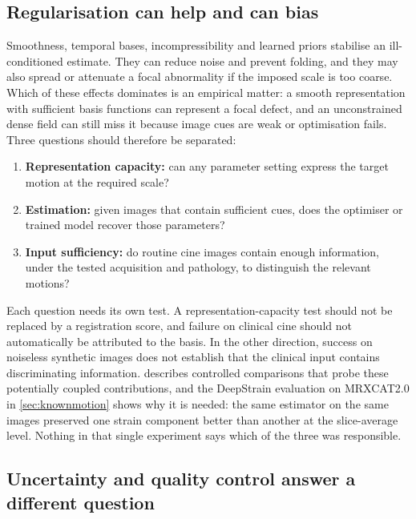 \subsection{Regularisation can help and can bias}\label{sec:threequestions}

Smoothness, temporal bases, incompressibility and learned priors stabilise an ill-conditioned estimate. They can reduce noise and prevent folding, and they may also spread or attenuate a focal abnormality if the imposed scale is too coarse. Which of these effects dominates is an empirical matter: a smooth representation with sufficient basis functions can represent a focal defect, and an unconstrained dense field can still miss it because image cues are weak or optimisation fails. Three questions should therefore be separated:

\begin{enumerate}
\item \textbf{Representation capacity:} can any parameter setting express the target motion at the required scale?
\item \textbf{Estimation:} given images that contain sufficient cues, does the optimiser or trained model recover those parameters?
\item \textbf{Input sufficiency:} do routine cine images contain enough information, under the tested acquisition and pathology, to distinguish the relevant motions?
\end{enumerate}

Each question needs its own test. A representation-capacity test should not be replaced by a registration score, and failure on clinical cine should not automatically be attributed to the basis. In the other direction, success on noiseless synthetic images does not establish that the clinical input contains discriminating information.  describes controlled comparisons that probe these potentially coupled contributions, and the DeepStrain evaluation on MRXCAT2.0 in \cref{sec:knownmotion} shows why it is needed: the same estimator on the same images preserved one strain component better than another at the slice-average level. Nothing in that single experiment says which of the three was responsible.

\subsection{Uncertainty and quality control answer a different question}


